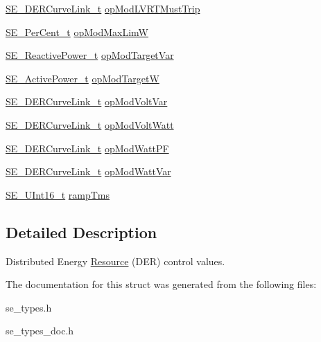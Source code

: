 \begin{DoxyCompactItemize}
\item 
\hyperlink{structSE__DERCurveLink__t}{S\+E\+\_\+\+D\+E\+R\+Curve\+Link\+\_\+t} \hyperlink{group__DERControlBase_ga53df2db63947a75e9d4a8b83ee434cf7}{op\+Mod\+L\+V\+R\+T\+Must\+Trip}
\item 
\hyperlink{group__PerCent_ga14278cbee754c63496035b722b417ddc}{S\+E\+\_\+\+Per\+Cent\+\_\+t} \hyperlink{group__DERControlBase_ga926fba7f7db0a007f7a5dbfeca61840a}{op\+Mod\+Max\+LimW}
\item 
\hyperlink{structSE__ReactivePower__t}{S\+E\+\_\+\+Reactive\+Power\+\_\+t} \hyperlink{group__DERControlBase_gacb1af6bfe16eeb2f8653a1ba5e5bb8d1}{op\+Mod\+Target\+Var}
\item 
\hyperlink{structSE__ActivePower__t}{S\+E\+\_\+\+Active\+Power\+\_\+t} \hyperlink{group__DERControlBase_ga1ff79302fcc3539736e4be0799aa66f4}{op\+Mod\+TargetW}
\item 
\hyperlink{structSE__DERCurveLink__t}{S\+E\+\_\+\+D\+E\+R\+Curve\+Link\+\_\+t} \hyperlink{group__DERControlBase_gac20fb88b06cf1190d01a1fd5ae20c52a}{op\+Mod\+Volt\+Var}
\item 
\hyperlink{structSE__DERCurveLink__t}{S\+E\+\_\+\+D\+E\+R\+Curve\+Link\+\_\+t} \hyperlink{group__DERControlBase_ga365b1200843285bc313d91791fe583b5}{op\+Mod\+Volt\+Watt}
\item 
\hyperlink{structSE__DERCurveLink__t}{S\+E\+\_\+\+D\+E\+R\+Curve\+Link\+\_\+t} \hyperlink{group__DERControlBase_ga15ce5a47c11d47a3e75630e935b0cd65}{op\+Mod\+Watt\+PF}
\item 
\hyperlink{structSE__DERCurveLink__t}{S\+E\+\_\+\+D\+E\+R\+Curve\+Link\+\_\+t} \hyperlink{group__DERControlBase_gafbb4008251d74dc443b9ad4279bee1d1}{op\+Mod\+Watt\+Var}
\item 
\hyperlink{group__UInt16_gac68d541f189538bfd30cfaa712d20d29}{S\+E\+\_\+\+U\+Int16\+\_\+t} \hyperlink{group__DERControlBase_ga69b8b3789a6a21ee8b6e718340dce614}{ramp\+Tms}
\end{DoxyCompactItemize}


\subsection{Detailed Description}
Distributed Energy \hyperlink{structResource}{Resource} (D\+ER) control values. 

The documentation for this struct was generated from the following files\+:\begin{DoxyCompactItemize}
\item 
se\+\_\+types.\+h\item 
se\+\_\+types\+\_\+doc.\+h\end{DoxyCompactItemize}
